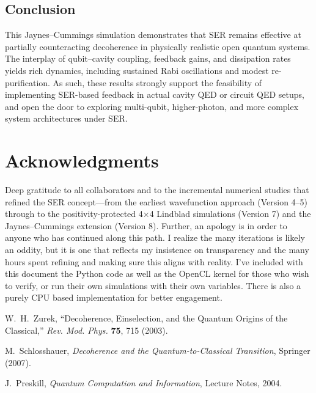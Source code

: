 \documentclass[12pt]{article}
\begin{document}
\subsection{Conclusion}
This Jaynes--Cummings simulation demonstrates that SER remains effective at partially counteracting decoherence in physically realistic open quantum systems. The interplay of qubit--cavity coupling, feedback gains, and dissipation rates yields rich dynamics, including sustained Rabi oscillations and modest re-purification. As such, these results strongly support the feasibility of implementing SER-based feedback in actual cavity QED or circuit QED setups, and open the door to exploring multi-qubit, higher-photon, and more complex system architectures under SER.

\section*{Acknowledgments}
Deep gratitude to all collaborators and to the incremental numerical studies that refined the SER concept---from the earliest wavefunction approach (Version 4--5) through to the positivity-protected 4$\times$4 Lindblad simulations (Version 7) and the Jaynes--Cummings extension (Version 8). Further, an apology is in order to anyone who has continued along this path. I realize the many iterations is likely an oddity, but it is one that reflects my insistence on transparency and the many hours spent refining and making sure this aligns with reality. I've included with this document the Python code as well as the OpenCL kernel for those who wish to verify, or run their own simulations with their own variables. There is also a purely CPU based implementation for better engagement.

\begin{thebibliography}{9}

W.~H.~Zurek, 
``Decoherence, Einselection, and the Quantum Origins of the Classical,''
\emph{Rev. Mod. Phys.} \textbf{75}, 715 (2003).

M.~Schlosshauer,
\emph{Decoherence and the Quantum-to-Classical Transition},
Springer (2007).

J.~Preskill,
\emph{Quantum Computation and Information},
Lecture Notes, 2004.

\end{thebibliography}
\end{document}
